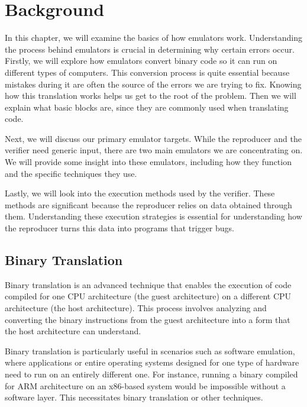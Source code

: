 
\chapter{Background}\label{chapter:background}
In this chapter, we will examine the basics of how emulators work.
Understanding the process behind emulators is crucial in determining why certain errors occur.
Firstly, we will explore how emulators convert binary code so it can run on different types of computers.
This conversion process is quite essential because mistakes during it are often the source of the errors we are trying to fix.
Knowing how this translation works helps us get to the root of the problem.
Then we will explain what basic blocks are, since they are commonly used when translating code.

Next, we will discuss our primary emulator targets.
While the reproducer and the verifier need generic input, there are two main emulators we are concentrating on.
We will provide some insight into these emulators, including how they function and the specific techniques they use.

Lastly, we will look into the execution methods used by the verifier.
These methods are significant because the reproducer relies on data obtained through them.
Understanding these execution strategies is essential for understanding how the reproducer turns this data into programs that trigger bugs.

\section{Binary Translation}
Binary translation is an advanced technique that enables the execution of code compiled for one CPU architecture (the guest architecture) on a different CPU architecture (the host architecture).
This process involves analyzing and converting the binary instructions from the guest architecture into a form that the host architecture can understand. 

Binary translation is particularly useful in scenarios such as software emulation, where applications or entire operating systems designed for one type of hardware need to run on an entirely different one.
For instance, running a binary compiled for ARM architecture on an x86-based system would be impossible without a software layer. This necessitates binary translation or other techniques.

